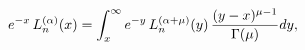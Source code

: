 \[e^{-x}\mathop{L^{(\alpha)}_{n}\/}\nolimits\!\left(x\right)=\int_{x}^{\infty}e^%
{-y}\mathop{L^{(\alpha+\mu)}_{n}\/}\nolimits\!\left(y\right)\frac{(y-x)^{\mu-1%
}}{\mathop{\Gamma\/}\nolimits\!\left(\mu\right)}dy,\]